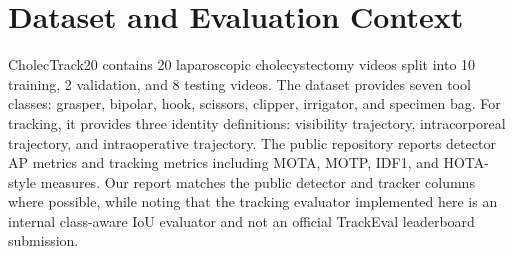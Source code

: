 \documentclass[12pt,a4paper]{report}
\begin{document}
\section{Dataset and Evaluation Context}
CholecTrack20 contains 20 laparoscopic cholecystectomy videos split into 10 training, 2 validation, and 8 testing videos. The dataset provides seven tool classes: grasper, bipolar, hook, scissors, clipper, irrigator, and specimen bag. For tracking, it provides three identity definitions: visibility trajectory, intracorporeal trajectory, and intraoperative trajectory. The public repository reports detector AP metrics and tracking metrics including MOTA, MOTP, IDF1, and HOTA-style measures. Our report matches the public detector and tracker columns where possible, while noting that the tracking evaluator implemented here is an internal class-aware IoU evaluator and not an official TrackEval leaderboard submission.
\end{document}
